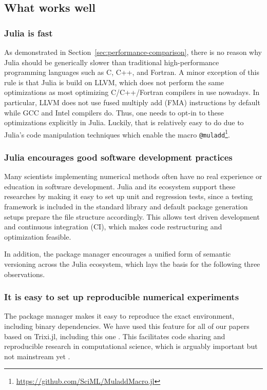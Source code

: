\documentclass{juliacon}
\newcommand{\trixi}{Trixi.jl\xspace}
\begin{document}
\subsection{What works well}

\subsubsection{Julia is fast}

As demonstrated in Section~\ref{sec:performance-comparison}, there is no reason
why Julia should be generically slower than traditional high-performance programming
languages such as C, C++, and Fortran. A minor exception of this rule is that
Julia is build on LLVM, which does not perform the same optimizations as most
optimizing C/C++/Fortran compilers in use nowadays. In particular, LLVM does
not use fused multiply add (FMA) instructions by default while GCC and Intel
compilers do. Thus, one needs to opt-in to these optimizations explicitly in
Julia. Luckily, that is relatively easy to do due to Julia's code manipulation
techniques which enable the macro \lstinline{@muladd}\footnote{\url{https://github.com/SciML/MuladdMacro.jl}}.

\subsubsection{Julia encourages good software development practices}

Many scientists implementing numerical methods often have no real experience or
education in software development. Julia and its ecosystem support these
researches by making it easy to set up unit and regression tests, since a
testing framework is included in the standard library and default package
generation setups prepare the file structure accordingly. This allows test
driven development and continuous integration (CI), which makes code restructuring
and optimization feasible.

In addition, the package manager encourages a unified form of semantic versioning
across the Julia ecosystem, which lays the basis for the following three
observations.

\subsubsection{It is easy to set up reproducible numerical experiments}

The package manager makes it easy to reproduce the exact environment, including
binary dependencies. We have used this feature for all of our papers based on
\trixi \cite{schlottkelakemper2021purely, ranocha2021preventing}, including this
one \cite{ranocha2021adaptiveRepro}.
This facilitates code sharing and reproducible research in computational science,
which is arguably important but not mainstream yet \cite{barnes2010publish,
donoho2010invitation, leveque2013top}.
\end{document}
